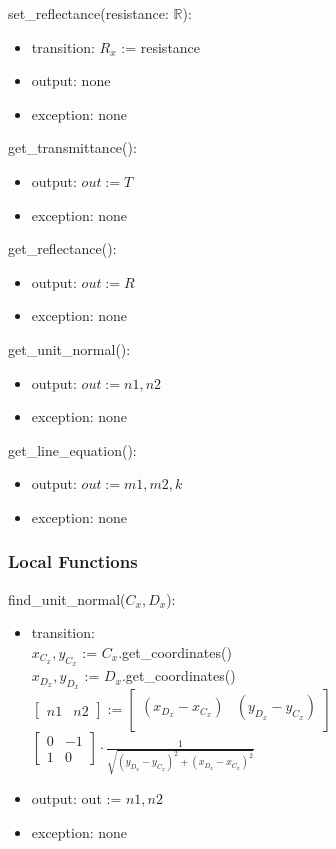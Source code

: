 \documentclass[12pt, titlepage]{article}
\begin{document}
\noindent set\_reflectance(resistance: $\mathbb{R}$):
\begin{itemize}
\item transition: $R_x$ := resistance
\item output: none
\item exception: none
\end{itemize}

\noindent get\_transmittance():
\begin{itemize}
\item output: $out := T$
\item exception: none
\end{itemize}

\noindent get\_reflectance():
\begin{itemize}
\item output: $out := R$
\item exception: none
\end{itemize}

\noindent get\_unit\_normal():
\begin{itemize}
\item output: $out := n1, n2$
\item exception: none
\end{itemize}

\noindent get\_line\_equation():
\begin{itemize}
\item output: $out := m1, m2, k$
\item exception: none
\end{itemize}

\subsubsection{Local Functions}
\noindent  find\_unit\_normal($C_x, D_x$):
\begin{itemize}
\item transition:\\
$x_{C_x}, y_{C_x}$ := $C_x$.get\_coordinates()\\
$x_{D_x}, y_{D_x}$ := $D_x$.get\_coordinates()\\
$\begin{bmatrix} n1 & n2 \end{bmatrix} := \begin{bmatrix}
  (x_{D_x}-x_{C_x}) & (y_{D_x}-y_{C_x})\\
  \end{bmatrix}$
  $\begin{bmatrix}
  0 & -1\\
  1 & 0
  \end{bmatrix} \cdot \frac{1}{\sqrt{(y_{D_x}-y_{C_x})^2+(x_{D_x}-x_{C_x})^2}}
  $
\item output: out := $n1, n2$
\item exception: none
\end{itemize}
\end{document}
